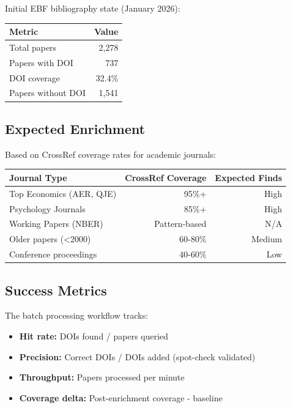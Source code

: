 Initial EBF bibliography state (January 2026):

\begin{center}
\begin{tabular}{lr}
\toprule
\textbf{Metric} & \textbf{Value} \\
\midrule
Total papers & 2,278 \\
Papers with DOI & 737 \\
DOI coverage & 32.4\% \\
Papers without DOI & 1,541 \\
\bottomrule
\end{tabular}
\end{center}

\subsection{Expected Enrichment}

Based on CrossRef coverage rates for academic journals:

\begin{center}
\begin{tabular}{lrr}
\toprule
\textbf{Journal Type} & \textbf{CrossRef Coverage} & \textbf{Expected Finds} \\
\midrule
Top Economics (AER, QJE) & 95\%+ & High \\
Psychology Journals & 85\%+ & High \\
Working Papers (NBER) & Pattern-based & N/A \\
Older papers (<2000) & 60-80\% & Medium \\
Conference proceedings & 40-60\% & Low \\
\bottomrule
\end{tabular}
\end{center}

\subsection{Success Metrics}

The batch processing workflow tracks:
\begin{itemize}
    \item \textbf{Hit rate:} DOIs found / papers queried
    \item \textbf{Precision:} Correct DOIs / DOIs added (spot-check validated)
    \item \textbf{Throughput:} Papers processed per minute
    \item \textbf{Coverage delta:} Post-enrichment coverage - baseline
\end{itemize}


